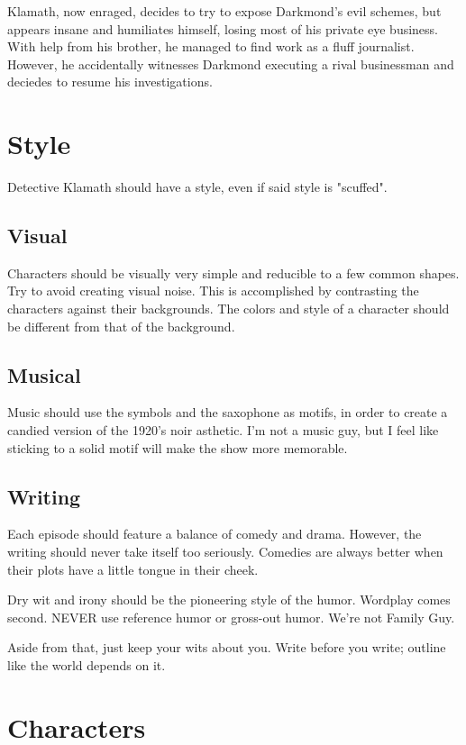 \documentclass{article}
\begin{document}
Klamath, now enraged, decides to try to expose Darkmond's evil schemes, but appears insane and humiliates himself, losing most of his private eye business. With help from his brother, he managed to find work as a fluff journalist. However, he accidentally witnesses Darkmond executing a rival businessman and deciedes to resume his investigations.

\section{Style}

Detective Klamath should have a style, even if said style is "scuffed".

\subsection{Visual}

Characters should be visually very simple and reducible to a few common shapes. Try to avoid creating visual noise. This is accomplished by contrasting the characters against their backgrounds. The colors and style of a character should be different from that of the background.

\subsection{Musical}

Music should use the symbols and the saxophone as motifs, in order to create a candied version of the 1920's noir asthetic. I'm not a music guy, but I feel like sticking to a solid motif will make the show more memorable.

\subsection{Writing}

Each episode should feature a balance of comedy and drama. However, the writing should never take itself too seriously. Comedies are always better when their plots have a little tongue in their cheek.

Dry wit and irony should be the pioneering style of the humor. Wordplay comes second. NEVER use reference humor or gross-out humor. We're not Family Guy.

Aside from that, just keep your wits about you. Write before you write; outline like the world depends on it.

\section{Characters}
\end{document}
